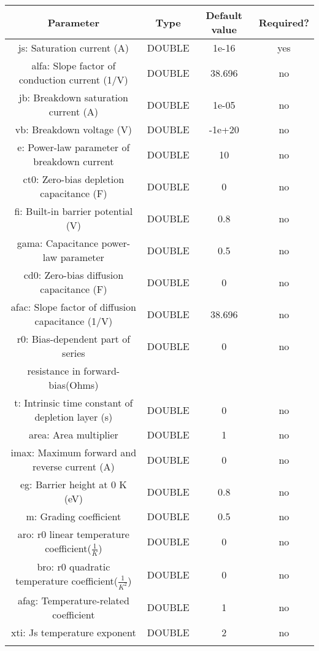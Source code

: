 \documentclass{article}
\begin{document}
\begin{table}[H]
\begin{tabular}{|c|c|c|c|}
\hline
Parameter&Type&Default value&Required?\\
\hline
js: Saturation current (A) & DOUBLE & 1e-16 & yes\\
\hline
alfa: Slope factor of conduction current (1/V) & DOUBLE & 38.696 & no\\
\hline
jb: Breakdown saturation current (A) & DOUBLE & 1e-05 & no\\
\hline
vb: Breakdown voltage (V) & DOUBLE & -1e+20 & no\\
\hline
e: Power-law parameter of breakdown current & DOUBLE & 10 & no\\
\hline
ct0: Zero-bias depletion capacitance (F) & DOUBLE & 0 & no\\
\hline
fi: Built-in barrier potential (V) & DOUBLE & 0.8 & no\\
\hline
gama: Capacitance power-law parameter & DOUBLE & 0.5 & no\\
\hline
cd0: Zero-bias diffusion capacitance (F) & DOUBLE & 0 & no\\
\hline
afac: Slope factor of diffusion capacitance (1/V) & DOUBLE & 38.696 & no\\
\hline
r0: Bias-dependent part of series & DOUBLE & 0 & no\\
resistance in forward-bias(Ohms) & & & \\
\hline
t: Intrinsic time constant of depletion layer (s) & DOUBLE & 0 & no\\
\hline
area: Area multiplier & DOUBLE & 1 & no\\
\hline
imax: Maximum forward and reverse current (A) & DOUBLE & 0 & no\\
\hline
eg: Barrier height at 0 K (eV) & DOUBLE & 0.8 & no\\
\hline
m: Grading coefficient & DOUBLE & 0.5 & no\\
\hline
aro: r0 linear temperature coefficient($\frac{1}{K}$) & DOUBLE & 0 & no\\
\hline
bro: r0 quadratic temperature coefficient($\frac{1}{{K}^2}$)& DOUBLE & 0 & no\\
\hline
afag: Temperature-related coefficient & DOUBLE & 1 & no\\
\hline
xti: Js temperature exponent & DOUBLE & 2 & no\\
\par
\hline
\end{tabular}
\end{table}
\end{document}
